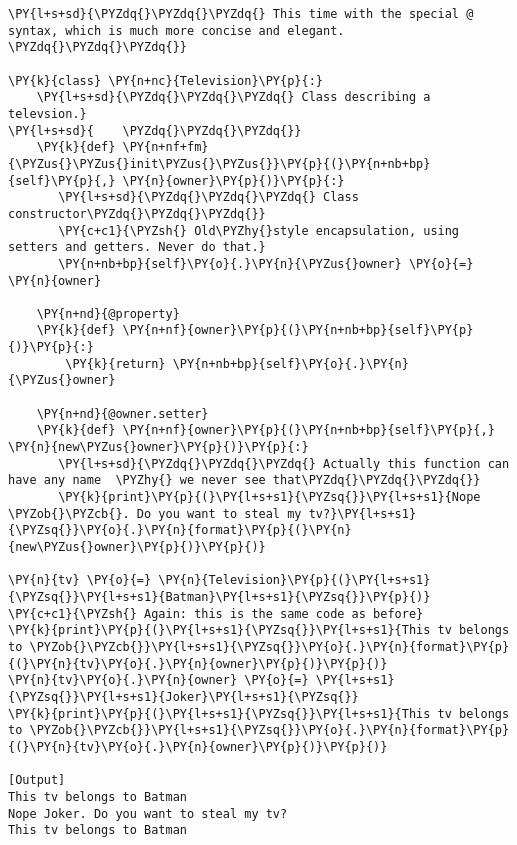 \begin{Verbatim}[label=\makebox{\url{https://bitbucket.org/lbaldini/programming/src/tip/snippets/class\_tv\_encapsulation\_properties.py}},commandchars=\\\{\}]
\PY{l+s+sd}{\PYZdq{}\PYZdq{}\PYZdq{} This time with the special @ syntax, which is much more concise and elegant. \PYZdq{}\PYZdq{}\PYZdq{}}

\PY{k}{class} \PY{n+nc}{Television}\PY{p}{:}
    \PY{l+s+sd}{\PYZdq{}\PYZdq{}\PYZdq{} Class describing a televsion.}
\PY{l+s+sd}{    \PYZdq{}\PYZdq{}\PYZdq{}}
    \PY{k}{def} \PY{n+nf+fm}{\PYZus{}\PYZus{}init\PYZus{}\PYZus{}}\PY{p}{(}\PY{n+nb+bp}{self}\PY{p}{,} \PY{n}{owner}\PY{p}{)}\PY{p}{:}
       \PY{l+s+sd}{\PYZdq{}\PYZdq{}\PYZdq{} Class constructor\PYZdq{}\PYZdq{}\PYZdq{}}
       \PY{c+c1}{\PYZsh{} Old\PYZhy{}style encapsulation, using setters and getters. Never do that.}
       \PY{n+nb+bp}{self}\PY{o}{.}\PY{n}{\PYZus{}owner} \PY{o}{=} \PY{n}{owner}
    
    \PY{n+nd}{@property}
    \PY{k}{def} \PY{n+nf}{owner}\PY{p}{(}\PY{n+nb+bp}{self}\PY{p}{)}\PY{p}{:}
        \PY{k}{return} \PY{n+nb+bp}{self}\PY{o}{.}\PY{n}{\PYZus{}owner}

    \PY{n+nd}{@owner.setter}
    \PY{k}{def} \PY{n+nf}{owner}\PY{p}{(}\PY{n+nb+bp}{self}\PY{p}{,} \PY{n}{new\PYZus{}owner}\PY{p}{)}\PY{p}{:}
       \PY{l+s+sd}{\PYZdq{}\PYZdq{}\PYZdq{} Actually this function can have any name  \PYZhy{} we never see that\PYZdq{}\PYZdq{}\PYZdq{}}
       \PY{k}{print}\PY{p}{(}\PY{l+s+s1}{\PYZsq{}}\PY{l+s+s1}{Nope \PYZob{}\PYZcb{}. Do you want to steal my tv?}\PY{l+s+s1}{\PYZsq{}}\PY{o}{.}\PY{n}{format}\PY{p}{(}\PY{n}{new\PYZus{}owner}\PY{p}{)}\PY{p}{)}
 
\PY{n}{tv} \PY{o}{=} \PY{n}{Television}\PY{p}{(}\PY{l+s+s1}{\PYZsq{}}\PY{l+s+s1}{Batman}\PY{l+s+s1}{\PYZsq{}}\PY{p}{)}
\PY{c+c1}{\PYZsh{} Again: this is the same code as before}
\PY{k}{print}\PY{p}{(}\PY{l+s+s1}{\PYZsq{}}\PY{l+s+s1}{This tv belongs to \PYZob{}\PYZcb{}}\PY{l+s+s1}{\PYZsq{}}\PY{o}{.}\PY{n}{format}\PY{p}{(}\PY{n}{tv}\PY{o}{.}\PY{n}{owner}\PY{p}{)}\PY{p}{)} 
\PY{n}{tv}\PY{o}{.}\PY{n}{owner} \PY{o}{=} \PY{l+s+s1}{\PYZsq{}}\PY{l+s+s1}{Joker}\PY{l+s+s1}{\PYZsq{}}
\PY{k}{print}\PY{p}{(}\PY{l+s+s1}{\PYZsq{}}\PY{l+s+s1}{This tv belongs to \PYZob{}\PYZcb{}}\PY{l+s+s1}{\PYZsq{}}\PY{o}{.}\PY{n}{format}\PY{p}{(}\PY{n}{tv}\PY{o}{.}\PY{n}{owner}\PY{p}{)}\PY{p}{)}

[Output]
This tv belongs to Batman
Nope Joker. Do you want to steal my tv?
This tv belongs to Batman
\end{Verbatim}
